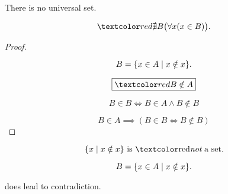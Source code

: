 \begin{frame}{}
  \begin{theorem}
    There is no universal set.

    \[
      \red{\nexists B} \big(\forall x (x \in B) \big).
    \]
  \end{theorem}

  \pause
  \begin{proof}
    \begin{center}
    \end{center}

    \pause
    \[
      B = \{x \in A \mid x \notin x\}.
    \]

    \pause
    \[
      \boxed{\red{B \notin A}}
    \]

    \pause
    \[
      B \in B \iff B \in A \land B \notin B
    \]

    \pause
    \vspace{-0.50cm}
    \[
      B \in A \implies (B \in B \iff B \notin B)
    \]
  \end{proof}
\end{frame}

\begin{frame}{}
  \begin{theorem}
    \[
      \set{x \mid x \notin x} \text{ is \red{\it not} a set.}
    \]
  \end{theorem}

  \pause
  \[
    B = \{x \in A \mid x \notin x\}.
  \]
  \begin{center}
    does  lead to contradiction.
  \end{center}
\end{frame}

